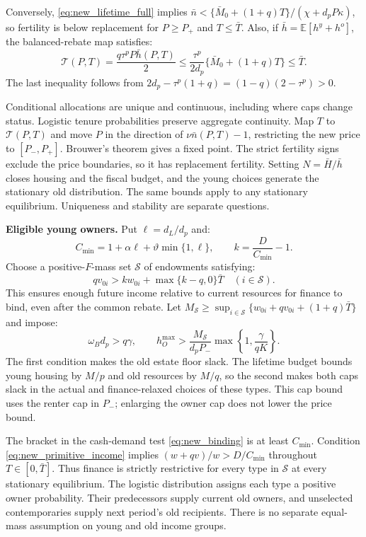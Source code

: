 \documentclass[11pt]{article}
\begin{document}
Conversely, \eqref{eq:new_lifetime_full} implies
$\bar n<\{\bar M_0+(1+q)T\}/(\chi+d_pP\kappa)$, so fertility is below
replacement for $P\ge P_+$ and $T\le\bar T$. Also, if
$\bar h=\mathbb E[h^y+h^o]$, the balanced-rebate map satisfies:
\begin{equation}
\mathcal T(P,T)=\frac{q\tau^pP\bar h(P,T)}2
\le\frac{\tau^p}{2d_p}\{\bar M_0+(1+q)T\}\le\bar T.
\end{equation}
The last inequality follows from
$2d_p-\tau^p(1+q)=(1-q)(2-\tau^p)>0$.

Conditional allocations are unique and continuous, including where caps
change status. Logistic tenure probabilities preserve aggregate continuity.
Map $T$ to $\mathcal T(P,T)$ and move $P$ in the direction of
$\nu\bar n(P,T)-1$, restricting the new price to $[P_-,P_+]$.
Brouwer's theorem gives a fixed point. The strict fertility signs exclude
the price boundaries, so it has replacement fertility. Setting
$N=\bar H/\bar h$ closes housing and the fiscal budget, and the young choices
generate the stationary old distribution. The same bounds apply to any
stationary equilibrium. Uniqueness and stability are separate questions.

\textbf{Eligible young owners.} Put $\ell=d_L/d_p$ and:
\begin{equation}
C_{\min}=1+\alpha\ell+\vartheta\min\{1,\ell\},\qquad
k=\frac D{C_{\min}}-1.
\end{equation}
Choose a positive-$F$-mass set $\mathcal S$ of endowments satisfying:
\begin{equation}
qv_{0i}>kw_{0i}+\max\{k-q,0\}\bar T\quad(i\in\mathcal S).
\label{eq:new_primitive_income}
\end{equation}
This ensures enough future income relative to current resources for finance
to bind, even after the common rebate. Let
$M_{\mathcal S}\ge\sup_{i\in\mathcal S}
\{w_{0i}+qv_{0i}+(1+q)\bar T\}$ and impose:
\begin{equation}
\omega_Bd_p>q\gamma,\qquad
h_O^{\max}>
\frac{M_{\mathcal S}}{d_pP_-}
\max\left\{1,\frac\gamma{qK}\right\}.
\label{eq:new_primitive_caps}
\end{equation}
The first condition makes the old estate floor slack. The lifetime budget
bounds young housing by $M/p$ and old resources by $M/q$, so the second makes
both caps slack in the actual and finance-relaxed choices of these types.
This cap bound uses the renter cap in $P_-$; enlarging the owner cap does not
lower the price bound.

The bracket in the cash-demand test \eqref{eq:new_binding} is at least
$C_{\min}$. Condition \eqref{eq:new_primitive_income} implies
$(w+qv)/w>D/C_{\min}$ throughout $T\in[0,\bar T]$.
Thus finance is strictly restrictive for every type in $\mathcal S$ at every
stationary equilibrium. The logistic distribution assigns each type a
positive owner probability. Their predecessors supply current old owners,
and unselected contemporaries supply next period's old recipients. There is
no separate equal-mass assumption on young and old income groups.
\end{document}
